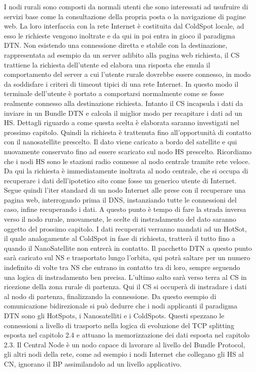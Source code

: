 \documentclass[a4paper]{article}
\begin{document}
		I nodi rurali sono composti da normali utenti che sono interessati ad usufruire di servizi base come la consultazione della propria posta o la navigazione di pagine web. La loro interfaccia con la rete Internet è costituita dal ColdSpot locale, ad esso le richieste vengono inoltrate e da qui in poi entra in gioco il paradigma DTN. Non esistendo una connessione diretta e stabile con la destinazione, rappresentata ad esempio da un server adibito alla pagina web richiesta, il CS trattiene la richiesta dell'utente ed elabora una risposta che emula il comportamento del server a cui l'utente rurale dovrebbe essere connesso, in modo da soddisfare i criteri di timeout tipici di una rete Internet. In questo modo il terminale dell'utente è portato a comportarsi normalmente come se fosse realmente connesso alla destinazione richiesta. Intanto il CS incapsula i dati da inviare in un Bundle DTN e calcola il miglior modo per recapitare i dati ad un HS. Dettagli riguardo a come questa scelta è elaborata saranno investigati nel prossimo capitolo. Quindi la richiesta è trattenuta fino all'opportunità di contatto con il nanosatellite prescelto. Il dato viene caricato a bordo del satellite e qui nuovamente conservato fino ad essere scaricato sul nodo HS prescelto. Ricordiamo che i nodi HS sono le stazioni radio connesse al nodo centrale tramite rete veloce. Da qui la richiesta è immediatamente inoltrata al nodo centrale, che si occupa di recuperare i dati dell'ipotetico sito come fosse un generico utente di Internet. Segue quindi l'iter standard di un nodo Internet alle prese con il recuperare una pagina web, interrogando prima il DNS, instanziando tutte le connessioni del caso, infine recuperando i dati. A questo punto è tempo di fare la strada inversa verso il nodo rurale, nuovamente, le scelte di instradamento del dato saranno oggetto del prossimo capitolo. I dati recuperati verranno mandati ad un HotSot, il quale analogamente al ColdSpot in fase di richiesta, tratterà il tutto fino a quando il NanoSatellite non entrerà in contatto. Il pacchetto DTN a questo punto sarà caricato sul NS e trasportato lungo l'orbita, qui potrà saltare per un numero indefinito di volte tra NS che entrano in contatto tra di loro, sempre seguendo una logica di instradamento ben precisa. L'ultimo salto sarà verso terra al CS in ricezione della zona rurale di partenza. Qui il CS si occuperà di instradare i dati al nodo di partenza, finalizzando la connessione.
		Da questo esempio di comunicazione bidirezionale si può dedurre che i nodi applicanti il paradigma DTN sono gli HotSpots, i Nanosatelliti e i ColdSpots. Questi spezzano le connessioni a livello di trasporto nella logica di evoluzione del TCP splitting esposta nel capitolo 2.4 e attuano la memorizzazione dei dati esposta nel capitolo 2.3. Il Central Node è un nodo capace di lavorare al livello del Bundle Protocol, gli altri nodi della rete, come ad esempio i nodi Internet che collegano gli HS al CN, ignorano il BP assimilandolo ad un livello applicativo. 
	
\end{document}
